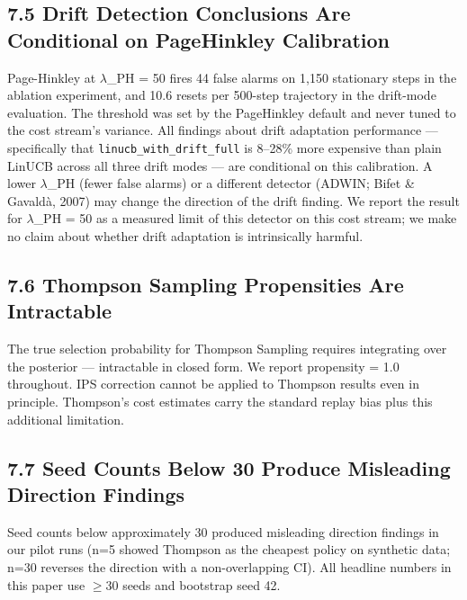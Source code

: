 \documentclass[10pt]{article}
\begin{document}
\subsection{7.5 Drift Detection Conclusions Are Conditional on
PageHinkley
Calibration}\label{drift-detection-conclusions-are-conditional-on-pagehinkley-calibration}

Page-Hinkley at $\lambda$\_PH = 50 fires 44 false alarms on 1,150 stationary
steps in the ablation experiment, and 10.6 resets per 500-step
trajectory in the drift-mode evaluation. The threshold was set by the
PageHinkley default and never tuned to the cost stream's variance. All
findings about drift adaptation performance --- specifically that
\texttt{linucb\_with\_drift\_full} is 8--28\% more expensive than plain
LinUCB across all three drift modes --- are conditional on this
calibration. A lower $\lambda$\_PH (fewer false alarms) or a different detector
(ADWIN; Bifet \& Gavald{\`a}, 2007) may change the direction of the drift
finding. We report the result for $\lambda$\_PH = 50 as a measured limit of this
detector on this cost stream; we make no claim about whether drift
adaptation is intrinsically harmful.

\subsection{7.6 Thompson Sampling Propensities Are
Intractable}\label{thompson-sampling-propensities-are-intractable}

The true selection probability for Thompson Sampling requires
integrating over the posterior --- intractable in closed form. We report
propensity = 1.0 throughout. IPS correction cannot be applied to
Thompson results even in principle. Thompson's cost estimates carry the
standard replay bias plus this additional limitation.



\subsection{7.7 Seed Counts Below 30 Produce Misleading Direction
Findings}\label{seed-counts-below-30-produce-misleading-direction-findings}

Seed counts below approximately 30 produced misleading direction
findings in our pilot runs (n=5 showed Thompson as the cheapest policy
on synthetic data; n=30 reverses the direction with a non-overlapping
CI). All headline numbers in this paper use $\geq$30 seeds and bootstrap seed
42.
\end{document}
